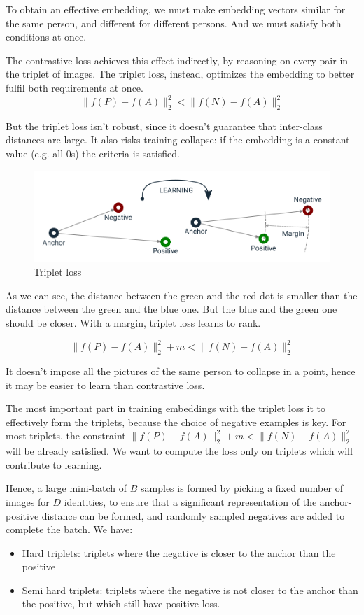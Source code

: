 To obtain an effective embedding, we must make embedding vectors similar for the same person, and different for different persons.
And we must satisfy both conditions at once.

The contrastive loss achieves this effect indirectly, by reasoning on every pair in the triplet of images.
The triplet loss, instead, optimizes the embedding to better fulfil both requirements at once.
$$\| f(P) - f(A) \|_2^2 < \| f(N) - f(A) \|_2^2$$

But the triplet loss isn't robust, since it doesn't guarantee that inter-class distances are large.
It also risks training collapse: if the embedding is a constant value (e.g. all 0s) the criteria is satisfied.

\begin{figure}[htbp]
  \centering
  \includegraphics[width=0.7\linewidth]{./img/triplet_loss.png}
  \caption{Triplet loss}
\end{figure}

As we can see, the distance between the green and the red dot is smaller than the distance between the green and the blue one.
But the blue and the green one should be closer.
With a margin, triplet loss learns to rank.

$$\| f(P) - f(A) \|_2^2 + m < \| f(N) - f(A) \|_2^2$$

It doesn't impose all the pictures of the same person to collapse in a point, hence it may be easier to learn than contrastive loss.

The most important part in training embeddings with the triplet loss it to effectively form the triplets, because the choice of negative examples is key.
For most triplets, the constraint $\| f(P) - f(A) \|_2^2 + m < \| f(N) - f(A) \|_2^2$ will be already satisfied.
We want to compute the loss only on triplets which will contribute to learning.

Hence, a large mini-batch of $B$ samples is formed by picking a fixed number of images for $D$ identities, to ensure that a significant representation of the anchor-positive distance can be formed, and randomly sampled negatives are added to complete the batch.
We have:
\begin{itemize}
  \item Hard triplets: triplets where the negative is closer to the anchor than the positive
  \item Semi hard triplets: triplets where the negative is not closer to the anchor than the positive, but which still have positive loss.
\end{itemize}

